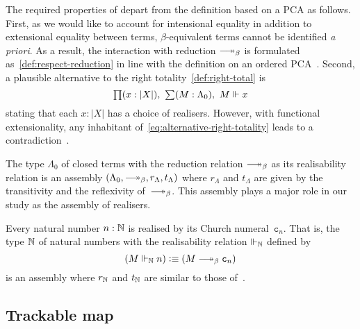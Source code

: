 \documentclass[a4paper,UKenglish,numberwithinsect,cleveref,thm-restate]{lipics-v2021}
\numberwithin{equation}{section}
\theoremstyle{plain}
\begin{document}
The required properties of  depart from the definition based on a PCA as follows. 
First, as we would like to account for intensional equality in addition to extensional equality between terms,
$\beta$-equivalent terms cannot be identified \emph{a priori}.
As a result, the interaction with reduction $\reduce$ is formulated as~\eqref{def:respect-reduction} in line with the definition on an ordered PCA~\cite[Section~2.3]{Hofstra2003}.
Second, a plausible alternative to the right totality~\eqref{def:right-total} is
\begin{equation}\label{eq:alternative-right-totality}
  \lprd{x : |X|} \lsm{M : \Lambda_0} M \Vdash x
\end{equation}
stating that each $x : |X|$ has a choice of realisers.
However, with functional extensionality, any inhabitant of~\eqref{eq:alternative-right-totality} leads to a contradiction~\cite{Troelstra1977}. 

\begin{example}\label{ex:assembly-lambda}
  The type $\Lambda_0$ of closed terms with the reduction relation ${\reduce}$ as its realisability relation is an assembly $(\Lambda_0, \reduce, r_\Lambda, t_\Lambda)$ where $r_\Lambda$ and $t_\Lambda$ are given by the transitivity and the reflexivity of~$\reduce$.
  This assembly plays a major role in our study as the assembly of realisers.
\end{example}

\begin{example}
  Every natural number $n : \mathbb{N}$ is realised by its Church numeral~$\mathtt{c}_n$. That is,
  the type $\mathbb{N}$ of natural numbers with the realisability relation $\Vdash_{\mathbb{N}}$ defined by
  \[
    \left(M \Vdash_\Nat n\right) \defeq \left(M \reduce \mathtt{c}_n\right)
  \]
  is an assembly where $r_\mathbb{N}$ and $t_\mathbb{N}$ are similar to those of~.  
\end{example}

\subsection{Trackable map}%
\end{document}
